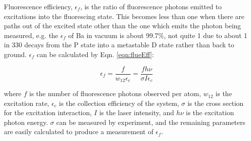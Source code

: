 Fluorescence efficiency, $\epsilon_{f}$, is the ratio of fluorescence photons emitted to excitations into the fluorescing state.  This becomes less than one when there are paths out of the excited state other than the one which emits the photon being measured, e.g. the $\epsilon_{f}$ of Ba in vacuum is about 99.7\%, not quite 1 due to about 1 in 330 decays from the P state into a metastable D state rather than back to ground.  $\epsilon_{f}$ can be calculated by Eqn. \ref{eqn:flueEff}:

\begin{equation}
\epsilon_{f} = \frac{f}{w_{12} \epsilon_{c}} = \frac{f h \nu}{\sigma I \epsilon_{c}}
\label{eqn:flueEff}
\end{equation}

\noindent
where $f$ is the number of fluorescence photons observed per atom, $w_{12}$ is the excitation rate, $\epsilon_{c}$ is the collection efficiency of the system, $\sigma$ is the cross section for the excitation interaction, $I$ is the laser intensity, and $h \nu$ is the excitation photon energy.  $\sigma$ can be measured by experiment, and the remaining parameters are easily calculated to produce a measurement of $\epsilon_{f}$.